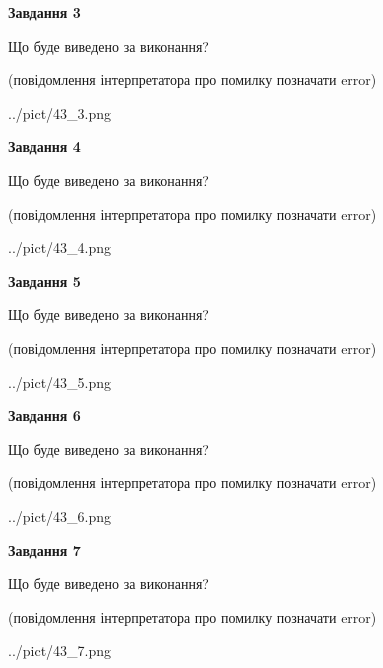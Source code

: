 \documentclass[12pt, ukrainian]{article}
\begin{document}
{\begin {large}
{\begin {center}\textbf{Завдання 3}\end {center}}\par
Що буде виведено за виконання?\par
 (повідомлення інтерпретатора про помилку позначати error)\par
\begin{center}
	{../pict/43_3.png}
\end{center}
\newpage

{\begin {center}\textbf{Завдання 4}\end {center}}\par
Що буде виведено за виконання?\par
 (повідомлення інтерпретатора про помилку позначати error)\par
\begin{center}
	{../pict/43_4.png}
\end{center}
\newpage

{\begin {center}\textbf{Завдання 5}\end {center}}\par
Що буде виведено за виконання?\par
 (повідомлення інтерпретатора про помилку позначати error)\par
\begin{center}
	{../pict/43_5.png}
\end{center}
\newpage

{\begin {center}\textbf{Завдання 6}\end {center}}\par
Що буде виведено за виконання?\par
 (повідомлення інтерпретатора про помилку позначати error)\par
\begin{center}
	{../pict/43_6.png}
\end{center}
\newpage

{\begin {center}\textbf{Завдання 7}\end {center}}\par
Що буде виведено за виконання?\par
 (повідомлення інтерпретатора про помилку позначати error)\par
\begin{center}
	{../pict/43_7.png}
\end{center}
\newpage


\end{large}}
\end{document}
